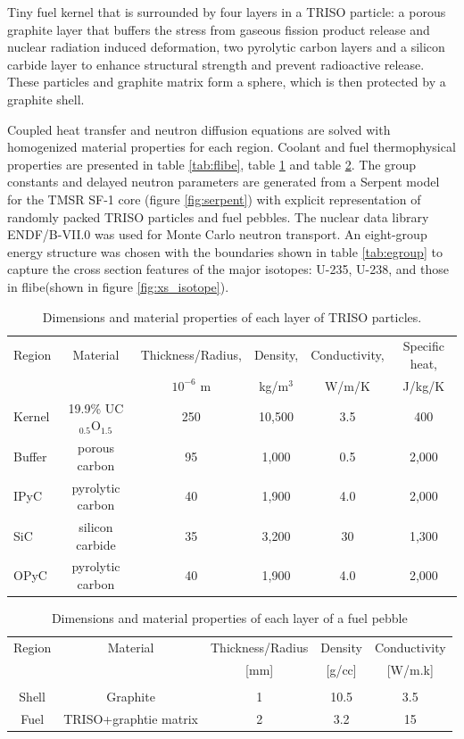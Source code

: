 \documentclass{elsarticle}
\begin{document}
Tiny fuel kernel that is surrounded by four layers in a TRISO particle: a porous graphite layer that buffers the stress from gaseous fission product release and nuclear radiation induced deformation, two pyrolytic carbon layers and a silicon carbide layer to enhance structural strength and prevent radioactive release.  These particles and graphite matrix form a sphere, which is then protected by a graphite shell. 




Coupled heat transfer and neutron diffusion equations are solved with homogenized material properties for each region. Coolant and fuel thermophysical properties are presented in table \ref{tab:flibe}, table \ref{tab:TRISO_prop} and table \ref{tab:pb_prop}. The group constants and delayed neutron parameters are generated from a Serpent model for the TMSR SF-1 core (figure \ref{fig:serpent}) with explicit representation of randomly packed TRISO particles and fuel pebbles. The nuclear data library ENDF/B-VII.0 was used for Monte Carlo neutron transport. 
An eight-group energy structure was chosen with the boundaries shown in table \ref{tab:egroup} to capture the cross section features of the major isotopes: U-235, U-238, and those in flibe(shown in figure \ref{fig:xs_isotope}). 

\begin{table}
  \caption{Dimensions and material properties of each layer of TRISO particles.}
  \begin{tabular}[h]{lccccc}
    \hline
    Region&Material&Thickness/Radius,&Density,&Conductivity,&Specific heat,\\
    &&$10^{-6}$ m&kg/m$^3$&W/m/K&J/kg/K\\
    \hline
    Kernel&19.9\% UC$_{0.5}$O$_{1.5}$&250&10,500&3.5&400\\
    Buffer&porous carbon&95&1,000&0.5&2,000\\
    IPyC&pyrolytic carbon&40&1,900&4.0&2,000\\
    SiC&silicon carbide&35&3,200&30&1,300\\
    OPyC&pyrolytic carbon&40&1,900&4.0&2,000\\
    \hline
  \end{tabular}
  \label{tab:TRISO_prop}
\end{table}


\begin{table}
  \begin{tabular}[h]{ccccc}
    Region&Material&Thickness/Radius&Density&Conductivity\\
    &&[mm]&[g/cc]&[W/m.k] \\
    \hline\\
    Shell&Graphite&1&10.5&3.5\\
    Fuel&TRISO+graphtie matrix&2&3.2&15\\
  \end{tabular}
  \caption{Dimensions and material properties of each layer of a fuel pebble}
  \label{tab:pb_prop}
\end{table}
\end{document}

